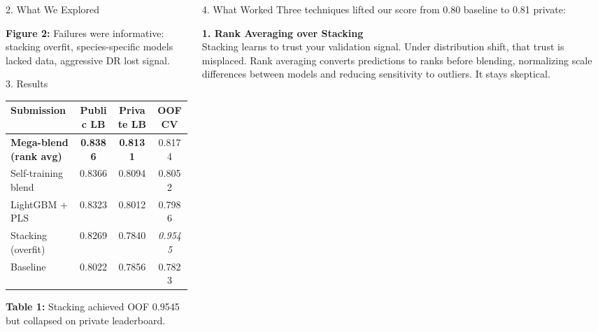 \documentclass[final]{beamer}
\begin{document}
\begin{frame}[t]
\begin{columns}[t,totalwidth=\textwidth]
\begin{column}{0.48\textwidth}
\begin{block}{2. What We Explored}
\vspace{-0.2em}
\begin{center}
{\normalsize\textbf{Figure 2:} Failures were informative: stacking overfit, species-specific models lacked data, aggressive DR lost signal.}
\end{center}
\end{block}
\vspace{-0.4em}

\vfill

\begin{block}{3. Results}
\vspace{0.3em}
\begin{center}
{\setlength{\tabcolsep}{0.6em}
\begin{tabular}{lccc}
\toprule
\textbf{Submission} & \textbf{Public LB} & \textbf{Private LB} & \textbf{OOF CV} \\
\midrule
\rowcolor{DarkBlue!10} \textbf{Mega-blend (rank avg)} & \textbf{0.8386} & \textbf{0.8131} & 0.8174 \\
Self-training blend & 0.8366 & 0.8094 & 0.8052 \\
LightGBM + PLS & 0.8323 & 0.8012 & 0.7986 \\
\rowcolor{Accent!10} Stacking (overfit) & 0.8269 & 0.7840 & \textit{0.9545} \\
Baseline & 0.8022 & 0.7856 & 0.7823 \\
\bottomrule
\end{tabular}}
\end{center}

\vspace{0.5em}
\begin{center}
{\normalsize\textbf{Table 1:} Stacking achieved OOF 0.9545 but collapsed on private leaderboard.}
\end{center}

\end{block}

\end{column}

\begin{column}{0.48\textwidth}

\begin{block}{4. What Worked}
Three techniques lifted our score from 0.80 baseline to 0.81 private:

\vspace{0.6em}
\textbf{1. Rank Averaging over Stacking}\\[0.3em]
Stacking learns to trust your validation signal. Under distribution shift, that trust is misplaced. Rank averaging converts predictions to ranks before blending, normalizing scale differences between models and reducing sensitivity to outliers. It stays skeptical.


\end{block}
\end{column}
\end{columns}
\end{frame}
\end{document}
